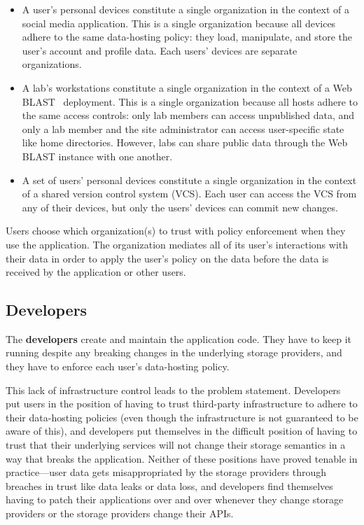 \begin{itemize}
   \item A user's personal devices constitute a single organization in the context of a
      social media application.  This is a single organization because all
      devices adhere to the same data-hosting policy:  they load, manipulate,
      and store the user's account and profile data.  Each users' devices are
      separate organizations.
   \item A lab's workstations constitute a single organization in the context of
      a Web BLAST~\cite{web-blast} deployment.  This is a single organization
      because all hosts adhere to the same access controls:  only lab members
      can access unpublished data, and only a lab member and the site
      administrator can access user-specific state like home directories.
      However, labs can share public data through the Web BLAST instance with
      one another.
   \item A set of users' personal devices constitute a single organization in
      the context of a shared version control system (VCS).  Each user can access the
      VCS from any of their devices, but only the users' devices can commit new
      changes.
\end{itemize}

Users choose which organization(s) to trust with policy enforcement when they
use the application.  The organization mediates all of its user's interactions
with their data in order to apply the user's policy on the data before the data
is received by the application or other users.

\subsection{Developers}

The \textbf{developers} create and maintain the application code.  They have to
keep it running despite any breaking changes in the underlying storage
providers, and they have to enforce each user's data-hosting policy.

This lack of infrastructure control leads to the problem statement.  Developers
put users in the position of having to trust third-party infrastructure
to adhere to their data-hosting policies (even though the infrastructure is not
guaranteed to be aware of this), and developers put themselves in the difficult
position of having to trust that their underlying services will not change their
storage semantics in a way that breaks the application.  Neither of these
positions have proved tenable in practice---user data gets misappropriated by the storage
providers through breaches in trust like data leaks or data loss, and developers
find themselves having to patch their applications over and over whenever they
change storage providers or the storage providers change their APIs.


